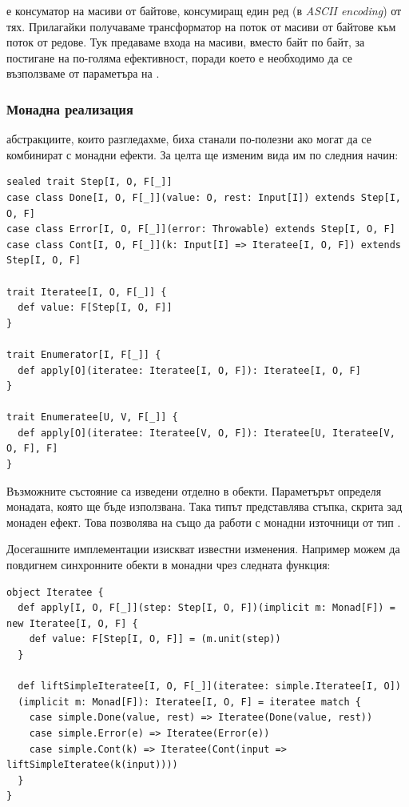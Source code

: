  е консуматор на масиви от байтове, консумиращ един ред (в \emph{ASCII encoding}) от тях. Прилагайки  получаваме  трансформатор на поток от масиви от байтове към поток от редове. Тук предаваме входа на масиви, вместо байт по байт, за постигане на по-голяма ефективност, поради което е необходимо да се възползваме от  параметъра на .

\subsubsection{Монадна реализация}

 абстракциите, които разгледахме, биха станали по-полезни ако могат да се комбинират с монадни ефекти. За целта ще изменим вида им по следния начин:

\begin{lstlisting}
sealed trait Step[I, O, F[_]]
case class Done[I, O, F[_]](value: O, rest: Input[I]) extends Step[I, O, F]
case class Error[I, O, F[_]](error: Throwable) extends Step[I, O, F]
case class Cont[I, O, F[_]](k: Input[I] => Iteratee[I, O, F]) extends Step[I, O, F]

trait Iteratee[I, O, F[_]] {
  def value: F[Step[I, O, F]]
}

trait Enumerator[I, F[_]] {
  def apply[O](iteratee: Iteratee[I, O, F]): Iteratee[I, O, F]
}

trait Enumeratee[U, V, F[_]] {
  def apply[O](iteratee: Iteratee[V, O, F]): Iteratee[U, Iteratee[V, O, F], F]
}
\end{lstlisting}

Възможните състояние са изведени отделно в  обекти. Параметърът  определя монадата, която ще бъде използвана. Така типът  представлява стъпка, скрита зад монаден ефект. Това позволява на  също да работи с монадни източници от тип .

Досегашните имплементации изискват известни изменения. Например можем да повдигнем синхронните  обекти в монадни чрез следната функция:

\begin{lstlisting}
object Iteratee {
  def apply[I, O, F[_]](step: Step[I, O, F])(implicit m: Monad[F]) = new Iteratee[I, O, F] {
    def value: F[Step[I, O, F]] = (m.unit(step))
  }
  
  def liftSimpleIteratee[I, O, F[_]](iteratee: simple.Iteratee[I, O])
  (implicit m: Monad[F]): Iteratee[I, O, F] = iteratee match {
    case simple.Done(value, rest) => Iteratee(Done(value, rest))
    case simple.Error(e) => Iteratee(Error(e))
    case simple.Cont(k) => Iteratee(Cont(input => liftSimpleIteratee(k(input))))
  }
}
\end{lstlisting}


